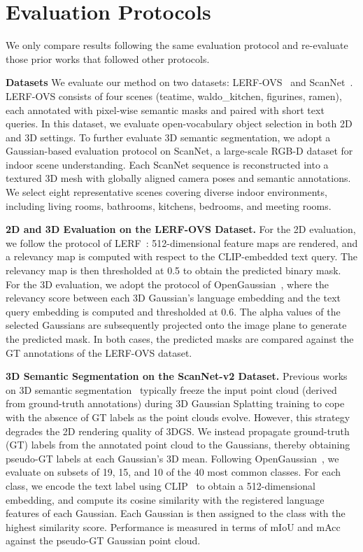 \section{Evaluation Protocols}
\label{subsec:eval_prot}
We only compare results following the same evaluation protocol and re-evaluate those prior works that followed other protocols.

\textbf{Datasets}
We evaluate our method on two datasets: LERF-OVS~\cite{qin2024langsplat} and ScanNet~\cite{dai2017scannet}. LERF-OVS consists of four scenes (teatime, waldo\_kitchen, figurines, ramen), each annotated with pixel-wise semantic masks and paired with short text queries. In this dataset, we evaluate open-vocabulary object selection in both 2D and 3D settings. To further evaluate 3D semantic segmentation, we adopt a Gaussian-based evaluation protocol on ScanNet, a large-scale RGB-D dataset for indoor scene understanding. Each ScanNet sequence is reconstructed into a textured 3D mesh with globally aligned camera poses and semantic annotations. We select eight representative scenes covering diverse indoor environments, including living rooms, bathrooms, kitchens, bedrooms, and meeting rooms.

\textbf{2D and 3D Evaluation on the LERF-OVS Dataset.}
For the 2D evaluation, we follow the protocol of LERF~\cite{kerr2023lerf}: 512-dimensional feature maps are rendered, and a relevancy map is computed with respect to the CLIP-embedded text query. The relevancy map is then thresholded at 0.5 to obtain the predicted binary mask. For the 3D evaluation, we adopt the protocol of OpenGaussian~\cite{wu2024opengaussian}, where the relevancy score between each 3D Gaussian’s language embedding and the text query embedding is computed and thresholded at 0.6. The alpha values of the selected Gaussians are subsequently projected onto the image plane to generate the predicted mask. In both cases, the predicted masks are compared against the GT annotations of the LERF-OVS dataset.

\textbf{3D Semantic Segmentation on the ScanNet-v2 Dataset.}
Previous works on 3D semantic segmentation~\cite{wu2024opengaussian, li2024instancegaussian} typically freeze the input point cloud (derived from ground-truth annotations) during 3D Gaussian Splatting training to cope with the absence of GT labels as the point clouds evolve. However, this strategy degrades the 2D rendering quality of 3DGS. We instead propagate ground-truth (GT) labels from the annotated point cloud to the Gaussians, thereby obtaining pseudo-GT labels at each Gaussian’s 3D mean. Following OpenGaussian~\cite{wu2024opengaussian}, we evaluate on subsets of 19, 15, and 10 of the 40 most common classes. For each class, we encode the text label using CLIP~\cite{radford2021clip} to obtain a 512-dimensional embedding, and compute its cosine similarity with the registered language features of each Gaussian. Each Gaussian is then assigned to the class with the highest similarity score. Performance is measured in terms of mIoU and mAcc against the pseudo-GT Gaussian point cloud.


